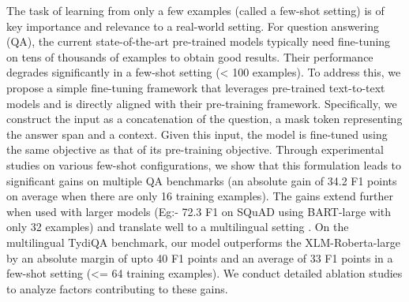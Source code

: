 The task of learning from only a few examples (called a few-shot setting) is of key importance and relevance to a real-world setting. For question answering (QA), the current state-of-the-art pre-trained models typically need fine-tuning on tens of thousands of examples to obtain good results. Their performance degrades significantly in a few-shot setting (< 100 examples). To address this, we propose a simple fine-tuning framework that leverages pre-trained text-to-text models and is directly aligned with their pre-training framework. Specifically, we construct the input as a concatenation of the question, a mask token representing the answer span and a context. Given this input, the model is fine-tuned using the same objective as that of its pre-training objective. Through experimental studies on various few-shot configurations, we show that this formulation leads to significant gains on multiple QA benchmarks (an absolute gain of 34.2 F1 points on average when there are only 16 training examples). The gains extend further when used with larger models (Eg:- 72.3 F1 on SQuAD using BART-large with only 32 examples) and translate well to a multilingual setting . On the multilingual TydiQA benchmark, our model outperforms the XLM-Roberta-large by an absolute margin of upto 40 F1 points and an average of 33 F1 points in a few-shot setting (<= 64 training examples). We conduct detailed ablation studies to analyze factors contributing to these gains.
